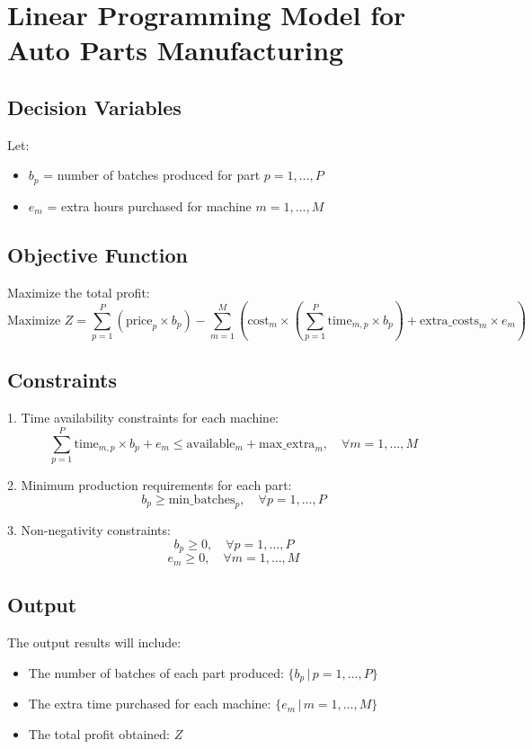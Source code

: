 \documentclass{article}
\begin{document}
\section*{Linear Programming Model for Auto Parts Manufacturing}

\subsection*{Decision Variables}
Let:
\begin{itemize}
    \item \( b_p \) = number of batches produced for part \( p = 1, \ldots, P \)
    \item \( e_m \) = extra hours purchased for machine \( m = 1, \ldots, M \)
\end{itemize}

\subsection*{Objective Function}
Maximize the total profit:
\[
\text{Maximize } Z = \sum_{p=1}^{P} \left( \text{price}_p \times b_p \right) - \sum_{m=1}^{M} \left( \text{cost}_m \times \left( \sum_{p=1}^{P} \text{time}_{m,p} \times b_p \right) + \text{extra\_costs}_m \times e_m \right)
\]

\subsection*{Constraints}
1. Time availability constraints for each machine:
\[
\sum_{p=1}^{P} \text{time}_{m,p} \times b_p + e_m \leq \text{available}_m + \text{max\_extra}_m, \quad \forall m = 1, \ldots, M
\]

2. Minimum production requirements for each part:
\[
b_p \geq \text{min\_batches}_p, \quad \forall p = 1, \ldots, P
\]

3. Non-negativity constraints:
\[
b_p \geq 0, \quad \forall p = 1, \ldots, P
\]
\[
e_m \geq 0, \quad \forall m = 1, \ldots, M
\]

\subsection*{Output}
The output results will include:
\begin{itemize}
    \item The number of batches of each part produced: \( \{ b_p \, | \, p = 1, \ldots, P \} \)
    \item The extra time purchased for each machine: \( \{ e_m \, | \, m = 1, \ldots, M \} \)
    \item The total profit obtained: \( Z \)
\end{itemize}
\end{document}
